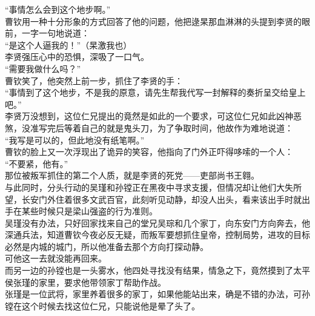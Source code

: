 \begin{multicols}{\theparacolNo}
“事情怎么会到这个地步啊。”\\

曹钦用一种十分形象的方式回答了他的问题，他把逯杲那血淋淋的头提到李贤的眼前，一字一句地说道：\\

“是这个人逼我的！”（杲激我也）\\

李贤强压心中的恐惧，深吸了一口气。\\

“需要我做什么吗？”\\

曹钦笑了，他突然上前一步，抓住了李贤的手：\\

“事情到了这个地步，不是我的原意，请先生帮我代写一封解释的奏折呈交给皇上吧。”\\

李贤万没想到，这位仁兄提出的竟然是如此的一个要求，可这位仁兄如此凶神恶煞，没准写完后等着自己的就是鬼头刀，为了争取时间，他故作为难地说道：\\

“我写是可以的，但此地没有纸笔啊。”\\

曹钦的脸上又一次浮现出了诡异的笑容，他指向了门外正吓得哆嗦的一个人：\\

“不要紧，他有。”\\

那位被叛军抓住的第二个人质，就是李贤的死党——吏部尚书王翱。\\

与此同时，分头行动的吴瑾和孙镗正在黑夜中寻求支援，但情况却让他们大失所望，长安门外住着很多文武百官，此刻听见动静，却没人出头，看来该出手时就出手在某些时候只是梁山强盗的行为准则。\\

吴瑾没有办法，只好回家找来自己的堂兄吴琮和几个家丁，向东安门方向奔去，他深通兵法，知道曹钦今夜必反无疑，而叛军要想抓住皇帝，控制局势，进攻的目标必然是内城的城门，所以他准备去那个方向打探动静。\\

可他这一去就没能再回来。\\

而另一边的孙镗也是一头雾水，他四处寻找没有结果，情急之下，竟然摸到了太平侯张瑾的家里，要求他带领家丁帮助作战。\\

张瑾是一位武将，家里养着很多的家丁，如果他能站出来，确是不错的办法，可孙镗在这个时候去找这位仁兄，只能说他是晕了头了。\\


\end{multicols}
